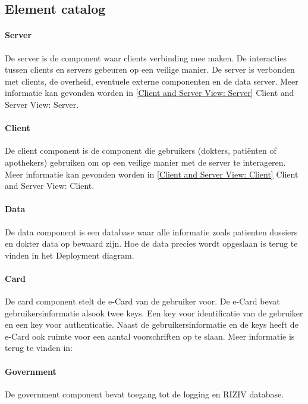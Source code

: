 \documentclass[a4paper,10pt]{book}
\begin{document}
\subsection{Element catalog}

\paragraph{Server}
De server is de component waar clients verbinding mee maken.  De interacties tussen clients en servers gebeuren op een veilige manier.  De server is verbonden met clients, de overheid, eventuele externe componenten en de data server.  Meer informatie kan gevonden worden in \ref{Client and Server View: Server} Client and Server View: Server.

\paragraph{Client}
De client component is de component die gebruikers (dokters, pati\"{e}nten of apothekers) gebruiken om op een veilige manier met de server te interageren.  Meer informatie kan gevonden worden in \ref{Client and Server View: Client} Client and Server View: Client.

\paragraph{Data}
De data component is een database waar alle informatie zoals patienten dossiers en dokter data op bewaard zijn.  Hoe de data precies wordt opgeslaan is terug te vinden in het Deployment diagram.

\paragraph{Card}
De card component stelt de e-Card van de gebruiker voor.  De e-Card bevat gebruikersinformatie alsook twee keys.  Een key voor identificatie van de gebruiker en een key voor authenticatie.  Naast de gebruikersinformatie en de keys heeft de e-Card ook ruimte voor een aantal voorschriften op te slaan.  Meer informatie is terug te vinden in:

\paragraph{Government}
De government component bevat toegang tot de logging en RIZIV database.
\end{document}
